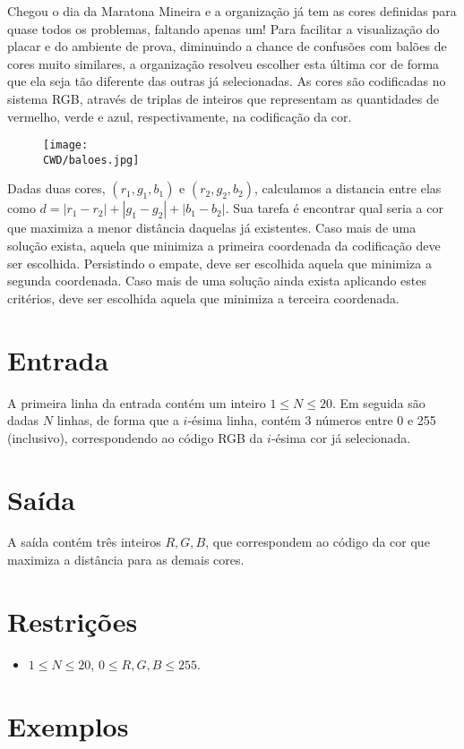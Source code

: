 Chegou o dia da Maratona Mineira e a organização já tem as cores definidas para quase todos os problemas, faltando apenas um!
Para facilitar a visualização do placar e do ambiente de prova, diminuindo a chance de confusões com balões de cores muito similares,
a organização resolveu escolher esta última cor de forma que ela seja tão diferente das outras já selecionadas. As cores são codificadas
no sistema RGB, através de triplas de inteiros que representam as quantidades de vermelho, verde e azul, respectivamente,
na codificação da cor.

\begin{figure}[H]
    \centering
    \texttt{[image: \\CWD/baloes.jpg]}
\end{figure}

Dadas duas cores, $(r_1,g_1,b_1)$ e $(r_2,g_2,b_2)$, calculamos a distancia entre elas como $d = |r_1-r_2| + |g_1-g_2| + |b_1-b_2|$.
Sua tarefa é encontrar qual seria a cor que maximiza a menor distância daquelas já existentes. Caso mais de uma solução exista,
aquela que minimiza a primeira coordenada da codificação deve ser escolhida. Persistindo o empate, deve ser escolhida aquela que minimiza
a segunda coordenada. Caso mais de uma solução ainda exista aplicando estes critérios, deve ser escolhida aquela que minimiza a terceira coordenada.

\section*{Entrada}

A primeira linha da entrada contém um inteiro $1 \leq N \leq 20$. Em seguida são dadas $N$ linhas, de forma que a $i$-ésima linha, contém 3 números
entre 0 e 255 (inclusivo), correspondendo ao código RGB da $i$-ésima cor já selecionada.

\section*{Saída}

A saída contém três inteiros $R, G, B$, que correspondem ao código da cor que maximiza a distância para as demais cores.

\section*{Restrições}

\begin{itemize}
\item $1 \leq N \leq 20$, $0 \leq R, G, B \leq 255$.
\end{itemize}


\section*{Exemplos}

\sampleio
